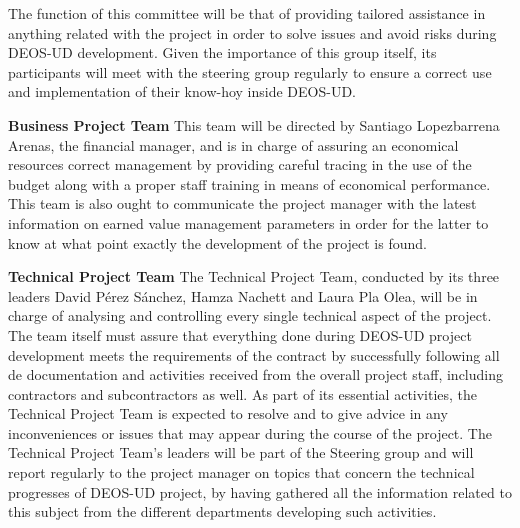The function of this committee will be that of providing tailored assistance in anything related with the project in order to solve issues and avoid risks during DEOS-UD development. Given the importance of this group itself, its participants will meet with the steering group regularly to ensure a correct use and implementation of their know-hoy inside DEOS-UD. 

\textbf{Business Project Team}
\newline
\newline
This team will be directed by Santiago Lopezbarrena Arenas, the financial manager, and is in charge of assuring an economical resources correct management by providing careful tracing in the use of the budget along with a proper staff training in means of economical performance. This team is also ought to communicate the project manager with the latest information on earned value management parameters in order for the latter to know at what point exactly the development of the project is found.   
 
\textbf{Technical Project Team}
\newline
\newline
The Technical Project Team, conducted by its three leaders David Pérez Sánchez, Hamza Nachett and Laura Pla Olea, will be in charge of analysing and controlling every single technical aspect of the project. The team itself must assure that everything done during DEOS-UD project development meets the requirements of the contract by successfully following all de documentation and activities received from the overall project staff, including contractors and subcontractors as well. As part of its essential activities, the Technical Project Team is expected to resolve and to give advice in any inconveniences or issues that may appear during the course of the project. 
The Technical Project Team’s leaders will be part of the Steering group and will report regularly to the project manager on topics that concern the technical progresses of DEOS-UD project, by having gathered all the information related to this subject from the different departments developing such activities. 

